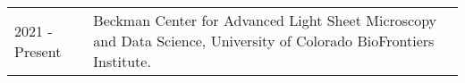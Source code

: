 \begin{tabular}{@{}p{2.5cm}L{12cm}@{}}
    {2021 - Present} & Beckman Center for Advanced Light Sheet Microscopy and Data Science, University of Colorado BioFrontiers Institute.
    
\end{tabular} 
\\